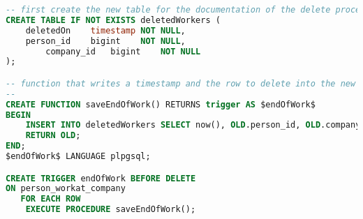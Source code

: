 \begin{lstlisting}[language=sql]
-- first create the new table for the documentation of the delete process
CREATE TABLE IF NOT EXISTS deletedWorkers (
	deletedOn    timestamp NOT NULL,
	person_id    bigint    NOT NULL,
      	company_id   bigint    NOT NULL
);

-- function that writes a timestamp and the row to delete into the new table
--
CREATE FUNCTION saveEndOfWork() RETURNS trigger AS $endOfWork$
BEGIN
	INSERT INTO deletedWorkers SELECT now(), OLD.person_id, OLD.company_id;
	RETURN OLD;
END;
$endOfWork$ LANGUAGE plpgsql;

CREATE TRIGGER endOfWork BEFORE DELETE
ON person_workat_company
   FOR EACH ROW
    EXECUTE PROCEDURE saveEndOfWork();
\end{lstlisting}


